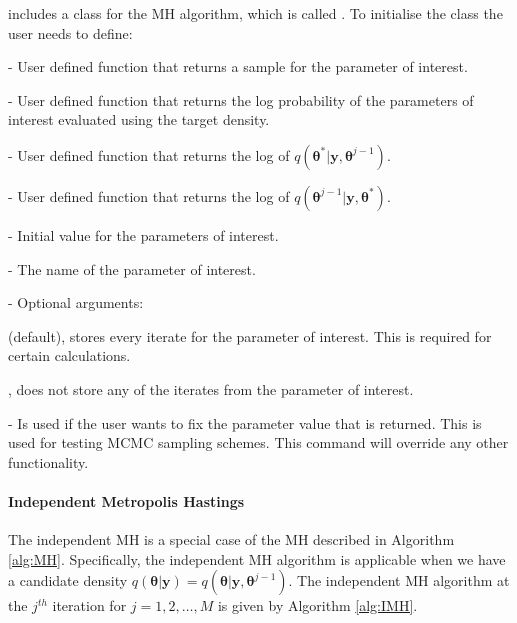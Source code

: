 \documentclass[article]{jss}
\begin{document}
 includes a class for the MH algorithm, which is called
.  To initialise the class the user needs to define:
\begin{description} 
\item {} - User defined function that returns a sample for
  the parameter of interest.
\item {} - User defined function that returns the log
  probability of the parameters of interest evaluated using the target
  density.
\item {} - User defined function that returns the log
  of $q\left(\bm{\theta}^{\ast}|\bm{y},\bm{\theta}^{j-1}\right).$
\item {} - User defined function that returns the log
  of $q\left(\bm{\theta}^{j-1}|\bm{y},\bm{\theta}^{*}\right).$
\item {} - Initial value for the parameters of
  interest.
\item {} - The name of the parameter of interest.
\item {} - Optional arguments:

  \begin{description}
  \item {}
    \begin{description}  
    \item {} (default), stores every iterate for the parameter
      of interest. This is required for certain calculations.
    \item {}, does not store any of the iterates from the parameter of
      interest.
    \end{description}
  \item {} - Is used if the user wants to fix the
    parameter value that is returned. This is used for testing MCMC
    sampling schemes.  This command will override any other
    functionality.
  \end{description}
\end{description}
\paragraph{Independent Metropolis Hastings}

The independent MH is a special case of the MH 
described in Algorithm \ref{alg:MH}. Specifically, the
independent MH algorithm is applicable when we have a candidate
density
$q(\bm{\theta}|\bm{y})=q(\bm{\theta}|\bm{y},\bm{\theta}^{j-1})$.  The
independent MH algorithm at the $j^{th}$ iteration for
$j=1,2,\ldots,M$ is given by Algorithm \ref{alg:IMH}.
\end{document}
